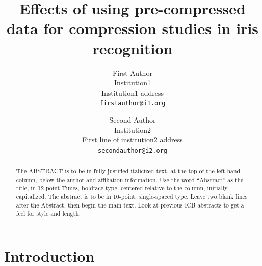 \documentclass[10pt,twocolumn,letterpaper]{article}
\begin{document}
\title{Effects of using pre-compressed data for compression studies in iris recognition}

\author{First Author\\
Institution1\\
Institution1 address\\
{\tt\small firstauthor@i1.org}
\and
Second Author\\
Institution2\\
First line of institution2 address\\
{\tt\small secondauthor@i2.org}
}






\maketitle
\thispagestyle{empty}

\begin{abstract}
   The ABSTRACT is to be in fully-justified italicized text, at the top
   of the left-hand column, below the author and affiliation
   information. Use the word ``Abstract'' as the title, in 12-point
   Times, boldface type, centered relative to the column, initially
   capitalized. The abstract is to be in 10-point, single-spaced type.
   Leave two blank lines after the Abstract, then begin the main text.
   Look at previous ICB abstracts to get a feel for style and length. 
\end{abstract}

\section{Introduction}
\end{document}
